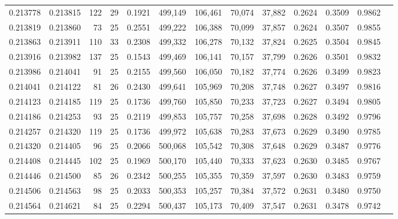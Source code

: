 \begin{tabular}{rrrrrrrrrrrrr}
0.213778 & 0.213815 & 122 &  29 &                                     0.1921 & 499,149 & 106,461 &  70,074 &  37,882 & 0.2624 & 0.3509 & 0.9862 \\
0.213819 & 0.213860 &  73 &  25 &                                     0.2551 & 499,222 & 106,388 &  70,099 &  37,857 & 0.2624 & 0.3507 & 0.9855 \\
0.213863 & 0.213911 & 110 &  33 &                                     0.2308 & 499,332 & 106,278 &  70,132 &  37,824 & 0.2625 & 0.3504 & 0.9845 \\
0.213916 & 0.213982 & 137 &  25 &                                     0.1543 & 499,469 & 106,141 &  70,157 &  37,799 & 0.2626 & 0.3501 & 0.9832 \\
0.213986 & 0.214041 &  91 &  25 &                                     0.2155 & 499,560 & 106,050 &  70,182 &  37,774 & 0.2626 & 0.3499 & 0.9823 \\
0.214041 & 0.214122 &  81 &  26 &                                     0.2430 & 499,641 & 105,969 &  70,208 &  37,748 & 0.2627 & 0.3497 & 0.9816 \\
0.214123 & 0.214185 & 119 &  25 &                                     0.1736 & 499,760 & 105,850 &  70,233 &  37,723 & 0.2627 & 0.3494 & 0.9805 \\
0.214186 & 0.214253 &  93 &  25 &                                     0.2119 & 499,853 & 105,757 &  70,258 &  37,698 & 0.2628 & 0.3492 & 0.9796 \\
0.214257 & 0.214320 & 119 &  25 &                                     0.1736 & 499,972 & 105,638 &  70,283 &  37,673 & 0.2629 & 0.3490 & 0.9785 \\
0.214320 & 0.214405 &  96 &  25 &                                     0.2066 & 500,068 & 105,542 &  70,308 &  37,648 & 0.2629 & 0.3487 & 0.9776 \\
0.214408 & 0.214445 & 102 &  25 &                                     0.1969 & 500,170 & 105,440 &  70,333 &  37,623 & 0.2630 & 0.3485 & 0.9767 \\
0.214446 & 0.214500 &  85 &  26 &                                     0.2342 & 500,255 & 105,355 &  70,359 &  37,597 & 0.2630 & 0.3483 & 0.9759 \\
0.214506 & 0.214563 &  98 &  25 &                                     0.2033 & 500,353 & 105,257 &  70,384 &  37,572 & 0.2631 & 0.3480 & 0.9750 \\
0.214564 & 0.214621 &  84 &  25 &                                     0.2294 & 500,437 & 105,173 &  70,409 &  37,547 & 0.2631 & 0.3478 & 0.9742 \\

\end{tabular}
